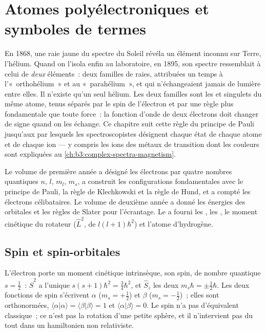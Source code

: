 \chapter{Atomes polyélectroniques et symboles de termes}\label{ch:b3:many-electron-atoms}

En 1868, une raie jaune du spectre du Soleil révéla un élément inconnu
sur Terre, l'hélium. Quand on l'isola enfin au laboratoire, en 1895, son
spectre ressemblait à celui de \emph{deux} éléments~: deux familles de
raies, attribuées un temps à l'«~orthohélium~» et au «~parahélium~», et
qui n'échangeaient jamais de lumière entre elles. Il n'existe qu'un seul
hélium. Les deux familles sont les  et singulets du même
atome, tenus séparés par le spin de l'électron et par une règle plus
fondamentale que toute force~: la fonction d'onde de deux électrons doit
changer de signe quand on les échange. Ce chapitre suit cette règle du
principe de Pauli jusqu'aux  par lesquels les
spectroscopistes désignent chaque état de chaque atome et de chaque ion
--- y compris les ions des métaux de transition dont les couleurs sont
expliquées au \cref{ch:b3:complex-spectra-magnetism}.

\begin{recall}
Le volume de première année a désigné les électrons par quatre nombres
quantiques $n$, $l$,
$m_l$, $m_s$, a construit les configurations fondamentales avec le
principe de Pauli, la règle de Klechkowski et la règle de Hund, et a
compté les électrons célibataires. Le volume de deuxième année a donné
les énergies des orbitales et les règles de Slater pour l'écrantage. Le
 a fourni les , les , le moment cinétique du rotateur ($\hat L^2$, de 
$l(l+1)\hbar^2$) et l'atome d'hydrogène.
\end{recall}

\section{Spin et spin-orbitales}

L'électron porte un moment cinétique intrinsèque, son spin, de nombre
quantique $s = \frac12$~: $\hat S^2$ a l'unique  $s(s+1)\hbar^2 =
\frac34\hbar^2$, et $\hat S_z$ les deux  $m_s\hbar = \pm\frac12\hbar$.
Les deux fonctions de spin s'écrivent $\alpha$ ($m_s = +\frac12$) et $\beta$
($m_s = -\frac12$)~; elles sont orthonormées, $\langle\alpha|\alpha\rangle =
\langle\beta|\beta\rangle = 1$ et $\langle\alpha|\beta\rangle = 0$. Le spin
n'a pas d'équivalent classique~; ce n'est pas la rotation d'une petite
sphère, et il n'intervient pas du tout dans un hamiltonien non
relativiste.

